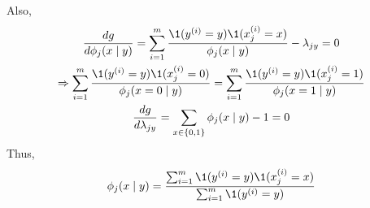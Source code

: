 \documentclass[a4paper]{article}
\begin{document}
\begin{enumerate}
Also, 
\begin{equation*}
  \begin{gathered}
    \frac{dg}{d \phi_j (x \mid y)} = \sum_{i = 1}^m \frac{\1 (y^{(i)}=y) \1 (x^{(i)}_j=x)}{\phi_j (x \mid y)} - \lambda_{jy} = 0\\
    \Rightarrow \sum_{i = 1}^m \frac{\1 (y^{(i)}=y) \1 (x^{(i)}_j=0)}{\phi_j (x=0 \mid y)} = \sum_{i = 1}^m \frac{\1 (y^{(i)}=y) \1 (x^{(i)}_j=1)}{\phi_j (x=1 \mid y)}\\
    \frac{dg}{d \lambda_{jy}} = \sum_{x \in \{0,1\}} \phi_j (x \mid y) - 1 = 0
  \end{gathered}
\end{equation*}
Thus,
\begin{equation*}
  \phi_j (x \mid y) = \frac{\sum_{i = 1}^m \1 (y^{(i)}=y) \1 (x^{(i)}_j=x)}{\sum_{i = 1}^m \1 (y^{(i)}=y)}
\end{equation*}
\end{enumerate}
  
  
  
\end{document}
